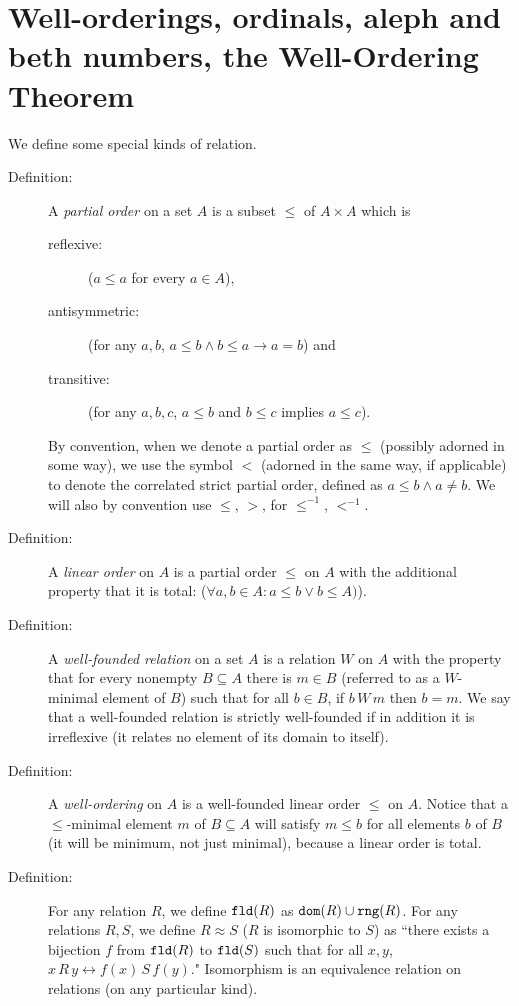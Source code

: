 \documentclass[12pt]{article}
\begin{document}
\newpage

\section{Well-orderings, ordinals, aleph and beth numbers, the Well-Ordering Theorem}

We define some special kinds of relation.

\begin{description}

\item[Definition:]  A {\em partial order\/} on a set $A$ is a subset $\leq$ of $A \times A$ which is \begin{description} \item[reflexive:] ($a \leq a$ for every $a \in A$), \item[antisymmetric:]  (for any $a,b$, $a \leq b \wedge b \leq a \rightarrow a=b$) and \item[transitive:]  (for any $a,b,c$, $a \leq b$ and $b \leq c$ implies $a \leq c$).\end{description}  By convention, when we denote a partial order as $\leq$ (possibly adorned in some way), we use the symbol $<$ (adorned in the same way, if applicable) to denote the correlated strict partial order, defined as $a \leq b \wedge a \neq b$.  We will also by convention use $\leq$, $>$, for $\leq^{-1}$, $<^{-1}$.

\item[Definition:]   A {\em linear order\/} on $A$ is a partial order $\leq$ on $A$ with the additional property that it is total: ($\forall a,b\in A:a \leq b \vee b \leq A)$).


\item[Definition:]  A {\em well-founded relation\/} on a set $A$ is a relation $W$ on $A$ with the property that for every nonempty $B \subseteq A$ there is $m \in B$ (referred to as a $W$-minimal element of $B$) such that
for all $b \in B$, if $b\, W \, m$ then $b=m$.  We say that a well-founded relation is strictly well-founded if in addition it is irreflexive (it relates no element of its domain to itself).

\item[Definition:]  A {\em well-ordering\/} on $A$ is a well-founded linear order $\leq$ on $A$.  Notice that a $\leq$-minimal element $m$ of $B \subseteq A$ will satisfy $m \leq b$ for all elements $b$ of $B$ (it will be minimum, not just minimal), because a linear order is total.

\item[Definition:]  For any relation $R$, we define ${\tt fld}(R)$ as ${\tt dom}(R) \cup {\tt rng}(R)$. For any relations $R,S$, we define $R \approx S$ ($R$ is isomorphic to $S$) as ``there exists a bijection $f$ from ${\tt fld}(R)$ to ${\tt fld}(S)$ such that for all $x,y$, $x\,R\,y \leftrightarrow f(x) \,S\, f(y)$."  Isomorphism is an equivalence relation on relations (on any particular kind).


\end{description}
\end{document}

